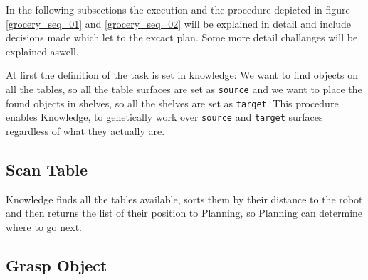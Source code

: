 \documentclass[main.tex]{subfiles}
\begin{document}
	In the following subsections the execution and the procedure depicted in figure \ref{grocery_seq_01} and \ref{grocery_seq_02} will be explained in detail and include decisions made which let to the excact plan. Some more detail challanges will be explained aswell.

	At first the definition of the task is set in knowledge: We want to find objects on all the tables, so all the table surfaces are set as \texttt{source} and we want to place the found objects in shelves, so all the shelves are set as \texttt{target}. This procedure enables Knowledge, to genetically work over \texttt{source} and \texttt{target} surfaces regardless of what they actually are.
	
	\subsection{Scan Table}
	
	
	
Knowledge finds all the tables available, sorts them by their distance to the robot and then returns the list of their position to Planning, so Planning can determine where to go next.
	
	
	
	
	
	
	
	
	
	
	
	\subsection{Grasp Object}
	
	
	
	
	
\end{document}
